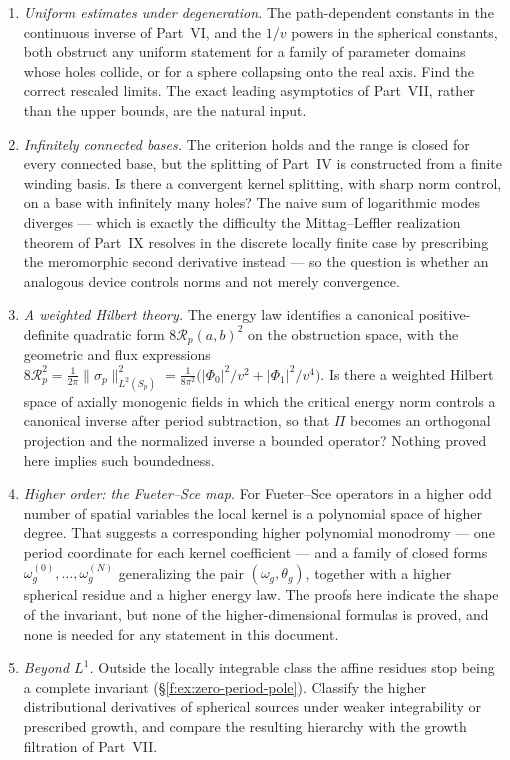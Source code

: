 \documentclass[11pt,a4paper]{article}
\numberwithin{equation}{section}
\theoremstyle{definition}
\theoremstyle{remark}
\theoremstyle{plain}
\newcommand{\om}{\omega}
\newcommand{\thet}{\theta}
\newcommand{\Sp}{S_{p}}
\newcommand{\Rp}{\mathcal R_{p}}      %
\newcommand{\abs}[1]{\lvert #1\rvert}
\newcommand{\norm}[1]{\lVert #1\rVert}
\begin{document}
\begin{enumerate}[label=\textup{(O\arabic*)}]
\item \emph{Uniform estimates under degeneration.} The path-dependent
constants in the continuous inverse of Part~VI, and the $1/v$ powers in the
spherical constants, both obstruct any uniform statement for a family of
parameter domains whose holes collide, or for a sphere collapsing onto the
real axis. Find the correct rescaled limits. The exact leading asymptotics
of Part~VII, rather than the upper bounds, are the natural input.
\item \emph{Infinitely connected bases.} The criterion holds and the range
is closed for every connected base, but the splitting of Part~IV is
constructed from a finite winding basis. Is there a convergent kernel
splitting, with sharp norm control, on a base with infinitely many holes?
The naive sum of logarithmic modes diverges --- which is exactly the
difficulty the Mittag--Leffler realization theorem of Part~IX resolves in
the discrete locally finite case by prescribing the meromorphic second
derivative instead --- so the question is whether an analogous device
controls norms and not merely convergence.
\item \emph{A weighted Hilbert theory.} The energy law identifies a
canonical positive-definite quadratic form $8\Rp(a,b)^2$ on the obstruction
space, with the geometric and flux expressions
$8\Rp^2=\frac1{2\pi}\norm{\sigma_p}^2_{L^2(\Sp)}
=\frac1{8\pi^2}\bigl(\abs{\Phi_0}^2/v^2+\abs{\Phi_1}^2/v^4\bigr)$.
Is there a weighted Hilbert space of axially monogenic fields in which the
critical energy norm controls a canonical inverse after period subtraction,
so that $\Pi$ becomes an orthogonal projection and the normalized inverse a
bounded operator? Nothing proved here implies such boundedness.
\item \emph{Higher order: the Fueter--Sce map.} For Fueter--Sce operators
in a higher odd number of spatial variables the local kernel is a
polynomial space of higher degree. That suggests a corresponding higher
polynomial monodromy --- one period coordinate for each kernel coefficient
--- and a family of closed forms $\om^{(0)}_g,\dots,\om^{(N)}_g$
generalizing the pair $(\om_g,\thet_g)$, together with a higher spherical
residue and a higher energy law. The proofs here indicate the shape of the
invariant, but none of the higher-dimensional formulas is proved, and none
is needed for any statement in this document.
\item \emph{Beyond $L^1$.} Outside the locally integrable class the affine
residues stop being a complete invariant (\S\ref{f:ex:zero-period-pole}).
Classify the higher distributional derivatives of spherical sources under
weaker integrability or prescribed growth, and compare the resulting
hierarchy with the growth filtration of Part~VII.
\end{enumerate}
\end{document}
